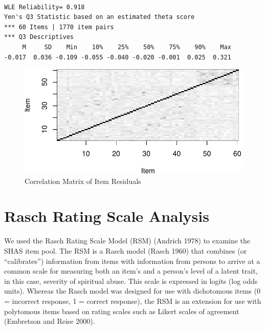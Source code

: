 \documentclass[
  letterpaper,
]{article}
\begin{document}
\begin{verbatim}

WLE Reliability= 0.918 
Yen's Q3 Statistic based on an estimated theta score 
*** 60 Items | 1770 item pairs
*** Q3 Descriptives
     M     SD    Min    10%    25%    50%    75%    90%    Max 
-0.017  0.036 -0.109 -0.055 -0.040 -0.020 -0.001  0.025  0.321 
\end{verbatim}

\begin{figure}

{\centering \includegraphics{./results_files/figure-pdf/fig-q3-1.pdf}

}

\caption{\label{fig-q3}Correlation Matrix of Item Residuals}

\end{figure}

\hypertarget{rasch-rating-scale-analysis}{%
\section*{Rasch Rating Scale
Analysis}\label{rasch-rating-scale-analysis}}

We used the Rasch Rating Scale Model (RSM) (Andrich 1978) to examine the
SHAS item pool. The RSM is a Rasch model (Rasch 1960) that combines (or
``calibrates'') information from items with information from persons to
arrive at a common scale for measuring both an item's and a person's
level of a latent trait, in this case, severity of spiritual abuse. This
scale is expressed in logits (log odds units). Whereas the Rasch model
was designed for use with dichotomous items (0 = incorrect response, 1 =
correct response), the RSM is an extension for use with polytomous items
based on rating scales such as Likert scales of agreement (Embretson and
Reise 2000).
\end{document}
